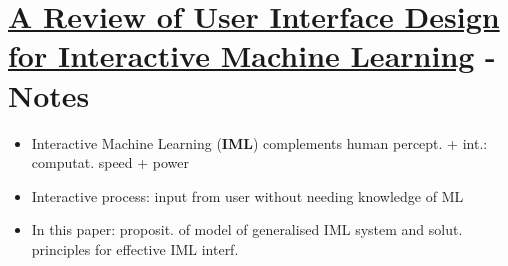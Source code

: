 \documentclass[12pt,a4paper]{article}
\begin{document}
\section{\href{https://doi.org/10.1145/3185517}{A Review of User Interface Design for Interactive Machine Learning} - Notes}
\begin{itemize}
\item Interactive Machine Learning (\textbf{IML}) complements human percept. + int.: computat. speed + power
\item Interactive process: input from user without needing knowledge of ML
\item In this paper: proposit. of model of generalised IML system and solut. principles for effective IML interf.
\end{itemize}
\end{document}
